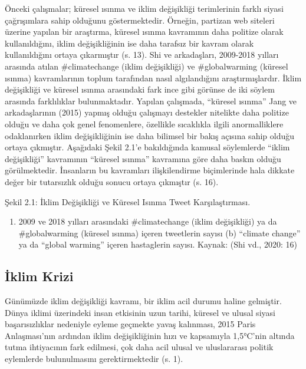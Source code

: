 \documentclass[
]{book}
\providecommand{\tightlist}{%
  \setlength{\itemsep}{0pt}\setlength{\parskip}{0pt}}
\begin{document}
Önceki çalışmalar; küresel ısınma ve iklim değişikliği terimlerinin farklı siyasi çağrışımlara sahip olduğunu göstermektedir. Örneğin, partizan web siteleri üzerine yapılan bir araştırma, küresel ısınma kavramının daha politize olarak kullanıldığını, iklim değişikliğinin ise daha tarafsız bir kavram olarak kullanıldığını ortaya çıkarmıştır (s. 13). \citep{jang2015polarized} Shi ve arkadaşları, 2009-2018 yılları arasında atılan \#climatechange (iklim değişikliği) ve \#globalwarming (küresel ısınma) kavramlarının toplum tarafından nasıl algılandığını araştırmışlardır. İklim değişikliği ve küresel ısınma arasındaki fark ince gibi görünse de iki söylem arasında farklılıklar bulunmaktadır. Yapılan çalışmada, ``küresel ısınma'' Jang ve arkadaşlarının (2015) yapmış olduğu çalışmayı destekler nitelikte daha politize olduğu ve daha çok genel fenomenlere, özellikle sıcaklıkla ilgili anormalliklere odaklanırken iklim değişikliğinin ise daha bilimsel bir bakış açısına sahip olduğu ortaya çıkmıştır. Aşağıdaki Şekil 2.1'e bakıldığında kamusal söylemlerde ``iklim değişikliği'' kavramının ``küresel ısınma'' kavramına göre daha baskın olduğu görülmektedir. İnsanların bu kavramları ilişkilendirme biçimlerinde hala dikkate değer bir tutarsızlık olduğu sonucu ortaya çıkmıştır (s. 16). \citep{shi2020climatechange}

Şekil 2.1: İklim Değişikliği ve Küresel Isınma Tweet Karşılaştırması.

\begin{enumerate}
\def\labelenumi{(\alph{enumi})}
\tightlist
\item
  2009 ve 2018 yılları arasındaki \#climatechange (iklim değişikliği) ya da \#globalwarming (küresel ısınma) içeren tweetlerin sayısı (b) ``climate change'' ya da ``global warming'' içeren hastaglerin sayısı.
  Kaynak: (Shi vd., 2020: 16) \citep{shi2020climatechange}
\end{enumerate}

\hypertarget{iklim-krizi}{%
\subsection{İklim Krizi}\label{iklim-krizi}}

Günümüzde iklim değişikliği kavramı, bir iklim acil durumu haline gelmiştir. Dünya iklimi üzerindeki insan etkisinin uzun tarihi, küresel ve ulusal siyasi başarısızlıklar nedeniyle eyleme geçmekte yavaş kalınması, 2015 Paris Anlaşması'nın ardından iklim değişikliğinin hızı ve kapsamıyla 1,5°C'nin altında tutma ihtiyacının fark edilmesi, çok daha acil ulusal ve uluslararası politik eylemlerde bulunulmasını gerektirmektedir (s. 1). \citep{harvey2016climate}
\end{document}

